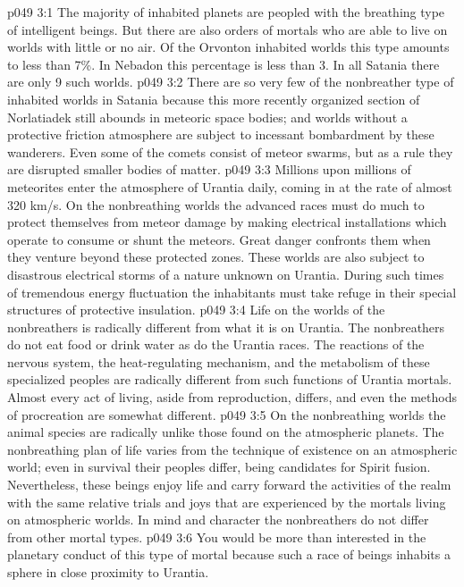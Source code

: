 \vs p049 3:1 The majority of inhabited planets are peopled with the breathing type of intelligent beings. But there are also orders of mortals who are able to live on worlds with little or no air. Of the Orvonton inhabited worlds this type amounts to less than 7\%. In Nebadon this percentage is less than 3. In all Satania there are only 9 such worlds.
\vs p049 3:2 There are so very few of the nonbreather type of inhabited worlds in Satania because this more recently organized section of Norlatiadek still abounds in meteoric space bodies; and worlds without a protective friction atmosphere are subject to incessant bombardment by these wanderers. Even some of the comets consist of meteor swarms, but as a rule they are disrupted smaller bodies of matter.
\vs p049 3:3 Millions upon millions of meteorites enter the atmosphere of Urantia daily, coming in at the rate of almost 320 km/s. On the nonbreathing worlds the advanced races must do much to protect themselves from meteor damage by making electrical installations which operate to consume or shunt the meteors. Great danger confronts them when they venture beyond these protected zones. These worlds are also subject to disastrous electrical storms of a nature unknown on Urantia. During such times of tremendous energy fluctuation the inhabitants must take refuge in their special structures of protective insulation.
\vs p049 3:4 Life on the worlds of the nonbreathers is radically different from what it is on Urantia. The nonbreathers do not eat food or drink water as do the Urantia races. The reactions of the nervous system, the heat\hyp{}regulating mechanism, and the metabolism of these specialized peoples are radically different from such functions of Urantia mortals. Almost every act of living, aside from reproduction, differs, and even the methods of procreation are somewhat different.
\vs p049 3:5 On the nonbreathing worlds the animal species are radically unlike those found on the atmospheric planets. The nonbreathing plan of life varies from the technique of existence on an atmospheric world; even in survival their peoples differ, being candidates for Spirit fusion. Nevertheless, these beings enjoy life and carry forward the activities of the realm with the same relative trials and joys that are experienced by the mortals living on atmospheric worlds. In mind and character the nonbreathers do not differ from other mortal types.
\vs p049 3:6 You would be more than interested in the planetary conduct of this type of mortal because such a race of beings inhabits a sphere in close proximity to Urantia.

